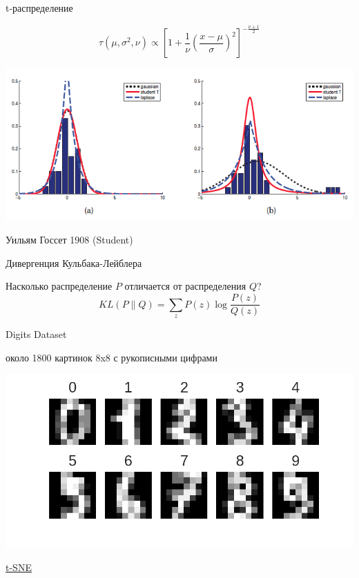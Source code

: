 \documentclass[aspectratio=169]{beamer}
\begin{document}
\begin{frame}{t-распределение}

\[
\tau(\mu, \sigma^2, \nu) \propto \left[1 + \frac{1}{\nu}\left(\frac{x-\mu}{\sigma}\right)^2\right]^{-\frac{\nu+1}{2}}
\]

\begin{center}
\includegraphics[scale=0.4]{images/t-distr.png}
\end{center}

Уильям Госсет 1908 (Student)

\end{frame}

\begin{frame}{Дивергенция Кульбака-Лейблера}

Насколько распределение $P$ отличается от распределения $Q$?
\[
KL(P \| Q) = \sum_z P(z) \log \frac{P(z)}{Q(z)}
\]

\end{frame}

\begin{frame}{Digits Dataset}

около 1800 картинок 8x8 с рукописными цифрами 

\begin{center}
\includegraphics[scale=0.5]{images/digits.png}
\end{center}

\href{https://raw.githubusercontent.com/oreillymedia/t-SNE-tutorial/master/images/animation.gif}{t-SNE}

\end{frame}
\end{document}
